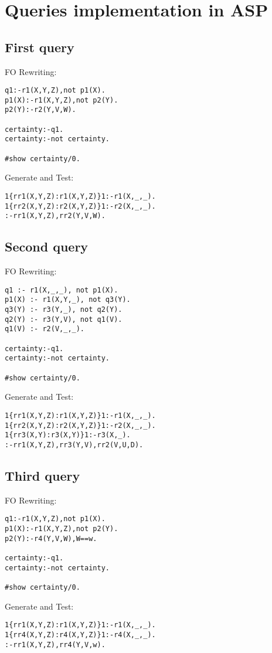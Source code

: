 
\section{Queries implementation in ASP}

\subsection{First query}

FO Rewriting:
\begin{lstlisting}
q1:-r1(X,Y,Z),not p1(X).
p1(X):-r1(X,Y,Z),not p2(Y).
p2(Y):-r2(Y,V,W).

certainty:-q1.
certainty:-not certainty.

#show certainty/0.
\end{lstlisting}

Generate and Test:
\begin{lstlisting}
1{rr1(X,Y,Z):r1(X,Y,Z)}1:-r1(X,_,_).
1{rr2(X,Y,Z):r2(X,Y,Z)}1:-r2(X,_,_).
:-rr1(X,Y,Z),rr2(Y,V,W).

\end{lstlisting}


\subsection{Second query}


FO Rewriting:
\begin{lstlisting}
q1 :- r1(X,_,_), not p1(X).
p1(X) :- r1(X,Y,_), not q3(Y).
q3(Y) :- r3(Y,_), not q2(Y).
q2(Y) :- r3(Y,V), not q1(V).
q1(V) :- r2(V,_,_).

certainty:-q1.
certainty:-not certainty.

#show certainty/0.
\end{lstlisting}

Generate and Test:
\begin{lstlisting}
1{rr1(X,Y,Z):r1(X,Y,Z)}1:-r1(X,_,_).
1{rr2(X,Y,Z):r2(X,Y,Z)}1:-r2(X,_,_).
1{rr3(X,Y):r3(X,Y)}1:-r3(X,_).
:-rr1(X,Y,Z),rr3(Y,V),rr2(V,U,D).

\end{lstlisting}


\subsection{Third query}

FO Rewriting:
\begin{lstlisting}
q1:-r1(X,Y,Z),not p1(X).
p1(X):-r1(X,Y,Z),not p2(Y).
p2(Y):-r4(Y,V,W),W==w.

certainty:-q1.
certainty:-not certainty.

#show certainty/0.
\end{lstlisting}

Generate and Test:
\begin{lstlisting}
1{rr1(X,Y,Z):r1(X,Y,Z)}1:-r1(X,_,_).
1{rr4(X,Y,Z):r4(X,Y,Z)}1:-r4(X,_,_).
:-rr1(X,Y,Z),rr4(Y,V,w).

\end{lstlisting}
